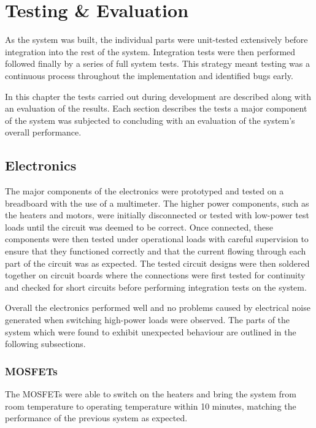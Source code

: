 \chapter{Testing \& Evaluation}
	
	\label{sec:testing}
	
	As the system was built, the individual parts were unit-tested extensively
	before integration into the rest of the system. Integration tests were then
	performed followed finally by a series of full system tests. This strategy
	meant testing was a continuous process throughout the implementation and
	identified bugs early.
	
	In this chapter the tests carried out during development are described along
	with an evaluation of the results. Each section describes the tests a major
	component of the system was subjected to concluding with an evaluation of the
	system's overall performance.
	
	\section{Electronics}
		
		The major components of the electronics were prototyped and tested on a
		breadboard with the use of a multimeter. The higher power components, such
		as the heaters and motors, were initially disconnected or tested with
		low-power test loads until the circuit was deemed to be correct. Once
		connected, these components were then tested under operational loads with
		careful supervision to ensure that they functioned correctly and that the
		current flowing through each part of the circuit was as expected. The tested
		circuit designs were then soldered together on circuit boards where the
		connections were first tested for continuity and checked for short circuits
		before performing integration tests on the system.
		
		Overall the electronics performed well and no problems caused by electrical
		noise generated when switching high-power loads were observed. The parts of
		the system which were found to exhibit unexpected behaviour are outlined in
		the following subsections.
		
		\subsection{MOSFETs}
			
			The MOSFETs were able to switch on the heaters and bring the system from
			room temperature to operating temperature within 10 minutes, matching the
			performance of the previous system as expected.
			
